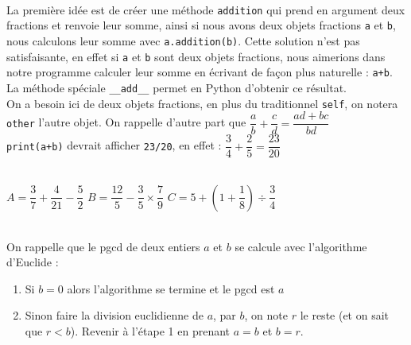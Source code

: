 \documentclass[11pt,a4paper]{article}
\begin{document}
\begin{Exercise}[title={POO et calcul sur les fractions},number=3]
 \\
La première idée est de créer une méthode {\tt addition} qui prend en argument deux fractions et renvoie leur somme, ainsi si nous avons deux objets fractions {\tt a} et {\tt b}, nous calculons leur somme avec {\tt a.addition(b)}. Cette solution n'est pas satisfaisante, en effet si {\tt a} et {\tt b} sont deux objets fractions, nous aimerions dans notre programme calculer leur somme en écrivant de façon plus naturelle : {\tt a+b}. La méthode spéciale {\tt \_\_add\_\_} permet en Python d'obtenir ce résultat.
 \\
\aide \; On a besoin ici de deux objets fractions, en plus du traditionnel {\tt self}, on notera {\tt other} l'autre objet. On rappelle d'autre part que $\dfrac{a}{b} + \dfrac{c}{d} = \dfrac{ad+bc}{bd} $
 \\
\aide \; {\tt print(a+b)} devrait afficher {\tt 23/20}, en effet : $\dfrac{3}{4}+\dfrac{2}{5} = \dfrac{23}{20}$


\\
$A = \dfrac{3}{7}+\dfrac{4}{21}-\dfrac{5}{2}$ \qquad \qquad  $B = \dfrac{12}{5} - \dfrac{3}{5}\times \dfrac{7}{9}$ \qquad \qquad $C = 5 + \left(1+ \dfrac{1}{8}\right)\div\dfrac{3}{4}$


\\
\aide \; On rappelle que le {\sc pgcd} de deux entiers $a$ et $b$ se calcule avec l'algorithme d'Euclide :
\begin{enumerate}
	\item Si $b=0$ alors l'algorithme se termine et le {\sc pgcd} est $a$
	\item Sinon faire la division euclidienne de $a$, par $b$, on note $r$ le reste (et on sait que $r<b$). Revenir à l'étape 1 en prenant $a=b$ et $b=r$.
\end{enumerate}
\end{Exercise}
\end{document}
